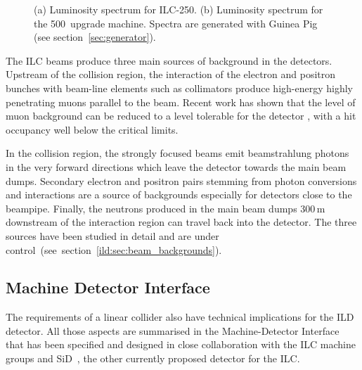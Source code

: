 \begin{figure}[htbp]
\begin{subfigure}{0.49\hsize}
 \caption{  \label{fig:ilc:ecmspect-500}}
 \end{subfigure}
\caption{
(a) Luminosity spectrum for ILC-250.
(b) Luminosity spectrum for the 500~\GeV upgrade machine.
Spectra are generated with Guinea Pig (see section~\ref{sec:generator}).
}
\label{fig:ilc:ecmspect}
\end{figure}

The ILC beams produce three main sources of background in the detectors. Upstream of the collision region, the interaction of the electron and positron bunches with beam-line elements such as collimators produce high-energy highly penetrating muons parallel to the beam. Recent work has shown that the level of muon background can be reduced to a level tolerable for the detector \cite{Keller:2019aak}, with a hit occupancy well below the critical limits. 

In the collision region, the strongly focused beams emit beamstrahlung photons in the very forward directions which leave the detector towards the main beam dumps. Secondary electron and positron pairs stemming from photon conversions and interactions are a source of backgrounds especially for detectors close to the beampipe. Finally, the neutrons produced in the main beam dumps 300\,m downstream of the interaction region can travel back into the detector. The three sources have been studied in detail and are under control~(see~section~\ref{ild:sec:beam_backgrounds}).

\subsection{Machine Detector Interface}
The requirements of a linear collider also have technical implications for the ILD detector. All those aspects are summarised in the Machine-Detector Interface that has been specified and designed in close collaboration with the ILC machine groups and SiD~\cite{bib:sid:loi}, the other currently proposed detector for the ILC.

